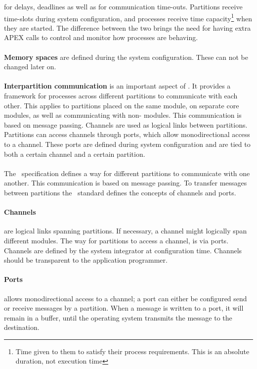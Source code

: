 for delays, deadlines as well as for communication time-outs.
Partitions receive time-slots during system configuration, and
processes receive time capacity\footnote{Time given to them to satisfy
their process requirements. This is an absolute duration, not execution time} when they are started.
The difference between the two brings the need for having extra APEX calls
to control and monitor how processes are behaving\cite{arinc_page_25}.
\\\\
\textbf{Memory spaces}
are defined during the system configuration. These can not
be changed later on.
\\\\
\textbf{Interpartition communication}
is an important aspect of \arinc{}. It provides a framework for processes across different partitions
to communicate with each other. This applies to partitions placed
on the same module, on separate core modules, as well as communicating with non-\arinc{} modules.
This communication is based on message passing. Channels are used as
logical links between partitions. Partitions can access channels through
ports, which allow monodirectional access to a channel\cite{arinc_page_27}.
These ports are defined during system configuration and are tied to
both a certain channel and a certain partition.
\\\\
\iffalse
The \arinc\ specification defines a way for different partitions to communicate with one another.
This communication is based on message passing. To transfer messages between partitions the \arinc\ standard
defines the concepts of channels and ports.

\paragraph{Channels} are logical links spanning partitions. If necessary, 
a channel might logically span different modules. 
The way for partitions to access a channel, is via ports.
Channels are defined by the system integrator at configuration time.
Channels should be transparent to the application programmer.

\paragraph{Ports} allows monodirectional access to a channel;
a port can either be configured send or receive messages by a partition.
When a message is written to a port, it will remain in a buffer, until the operating system transmits the message to the destination.\\

